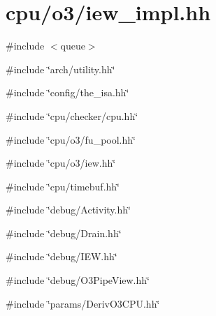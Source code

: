 \hypertarget{iew__impl_8hh}{
\section{cpu/o3/iew\_\-impl.hh}
\label{iew__impl_8hh}
}
{\ttfamily \#include $<$queue$>$}\par
{\ttfamily \#include \char`\"{}arch/utility.hh\char`\"{}}\par
{\ttfamily \#include \char`\"{}config/the\_\-isa.hh\char`\"{}}\par
{\ttfamily \#include \char`\"{}cpu/checker/cpu.hh\char`\"{}}\par
{\ttfamily \#include \char`\"{}cpu/o3/fu\_\-pool.hh\char`\"{}}\par
{\ttfamily \#include \char`\"{}cpu/o3/iew.hh\char`\"{}}\par
{\ttfamily \#include \char`\"{}cpu/timebuf.hh\char`\"{}}\par
{\ttfamily \#include \char`\"{}debug/Activity.hh\char`\"{}}\par
{\ttfamily \#include \char`\"{}debug/Drain.hh\char`\"{}}\par
{\ttfamily \#include \char`\"{}debug/IEW.hh\char`\"{}}\par
{\ttfamily \#include \char`\"{}debug/O3PipeView.hh\char`\"{}}\par
{\ttfamily \#include \char`\"{}params/DerivO3CPU.hh\char`\"{}}\par
